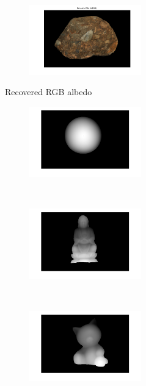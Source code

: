 \documentclass{paper}
\begin{document}
\begin{figure}[h!]
\begin{subfigure}[]{0.33\textwidth}
    \end{subfigure}%
    ~ 
    \begin{subfigure}[]{0.33\textwidth}
        \centering
        \includegraphics[height=1.2in]{rockRGB}
    \end{subfigure}

    \caption{Recovered RGB albedo}    
\end{figure}


\begin{figure}[h!]
    \centering
    \begin{subfigure}[]{0.33\textwidth}
        \centering
        \includegraphics[height=1.2in]{sphereDM}
    \end{subfigure}%
    ~ 
    \begin{subfigure}[]{0.33\textwidth}
        \centering
        \includegraphics[height=1.2in]{buddhaDM}
    \end{subfigure}%
    ~ 
    \begin{subfigure}[]{0.33\textwidth}
        \centering
        \includegraphics[height=1.2in]{catDM}
    \end{subfigure}
        \begin{subfigure}[]{0.33\textwidth}

\end{subfigure}
\end{figure}
\end{document}

